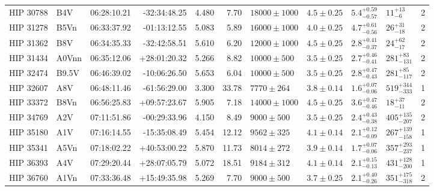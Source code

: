 \begin{landscape}
\begin{scriptsize}
\begin{longtable}{|l|lrrrrlllll|}
   HIP 30788 &      B4V &    06:28:10.21 &   -32:34:48.25 &   4.480 &      7.70 &  $18000 \pm 1000$ &  $4.5 \pm 0.25$ &  $5.4^{+0.59}_{-0.57}$ &       $11^{+13}_{-6}$ &       2 \\
   HIP 31278 &     B5Vn &    06:33:37.92 &   -01:13:12.55 &   5.083 &      5.89 &  $16000 \pm 1000$ &  $4.0 \pm 0.25$ &  $4.7^{+0.61}_{-0.56}$ &      $26^{+31}_{-18}$ &       2 \\
   HIP 31362 &      B8V &    06:34:35.33 &   -32:42:58.51 &   5.610 &      6.20 &  $12000 \pm 1000$ &  $4.5 \pm 0.25$ &  $2.8^{+0.41}_{-0.37}$ &      $24^{+62}_{-17}$ &       2 \\
   HIP 31434 &    A0Vnn &    06:35:12.06 &   +28:01:20.32 &   5.266 &      8.82 &   $10000 \pm 500$ &  $3.5 \pm 0.25$ &  $2.7^{+0.46}_{-0.41}$ &    $281^{+83}_{-131}$ &       2 \\
   HIP 32474 &    B9.5V &    06:46:39.02 &   -10:06:26.50 &   5.653 &      6.04 &   $10000 \pm 500$ &  $3.5 \pm 0.25$ &  $2.8^{+0.47}_{-0.43}$ &    $281^{+85}_{-117}$ &       2 \\
   HIP 32607 &      A8V &    06:48:11.46 &   -61:56:29.00 &   3.300 &     33.78 &    $7770 \pm 264$ &  $3.8 \pm 0.14$ &  $1.6^{+0.07}_{-0.06}$ &   $519^{+344}_{-333}$ &       1 \\
   HIP 33372 &     B8Vn &    06:56:25.83 &   +09:57:23.67 &   5.905 &      7.18 &  $14000 \pm 1000$ &  $4.5 \pm 0.25$ &  $3.6^{+0.47}_{-0.46}$ &      $18^{+37}_{-11}$ &       2 \\
   HIP 34769 &      A2V &    07:11:51.86 &   -00:29:33.96 &   4.150 &      8.49 &    $9000 \pm 500$ &  $3.5 \pm 0.25$ &  $2.4^{+0.43}_{-0.38}$ &   $405^{+135}_{-207}$ &       2 \\
   HIP 35180 &      A1V &    07:16:14.55 &   -15:35:08.49 &   5.454 &     12.12 &    $9562 \pm 325$ &  $4.1 \pm 0.14$ &  $2.1^{+0.12}_{-0.09}$ &   $267^{+139}_{-158}$ &       1 \\
   HIP 35341 &     A5Vn &    07:18:02.22 &   +40:53:00.22 &   5.870 &     11.73 &    $8014 \pm 272$ &  $3.9 \pm 0.14$ &  $1.7^{+0.07}_{-0.06}$ &   $357^{+293}_{-237}$ &       1 \\
   HIP 36393 &      A4V &    07:29:20.44 &   +28:07:05.79 &   5.072 &     18.51 &    $9184 \pm 312$ &  $4.1 \pm 0.14$ &  $2.1^{+0.15}_{-0.13}$ &   $431^{+128}_{-200}$ &       1 \\
   HIP 36760 &     A1Vn &    07:33:36.48 &   +15:49:35.98 &   5.269 &      7.70 &    $9000 \pm 500$ &  $3.7 \pm 0.25$ &  $2.1^{+0.40}_{-0.26}$ &   $351^{+175}_{-318}$ &       2 \\

\end{longtable}
\end{scriptsize}
\end{landscape}
